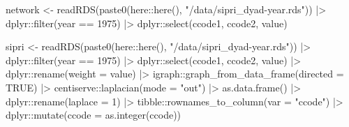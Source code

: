 \documentclass[
  12,
  letterpaper,
  DIV=11,
  numbers=noendperiod]{scrartcl}
\newenvironment{Shaded}{\begin{snugshade}}{\end{snugshade}}
\newcommand{\AttributeTok}[1]{\textcolor[rgb]{0.40,0.45,0.13}{#1}}
\newcommand{\ConstantTok}[1]{\textcolor[rgb]{0.56,0.35,0.01}{#1}}
\newcommand{\DecValTok}[1]{\textcolor[rgb]{0.68,0.00,0.00}{#1}}
\newcommand{\FunctionTok}[1]{\textcolor[rgb]{0.28,0.35,0.67}{#1}}
\newcommand{\NormalTok}[1]{\textcolor[rgb]{0.00,0.23,0.31}{#1}}
\newcommand{\OtherTok}[1]{\textcolor[rgb]{0.00,0.23,0.31}{#1}}
\newcommand{\SpecialCharTok}[1]{\textcolor[rgb]{0.37,0.37,0.37}{#1}}
\newcommand{\StringTok}[1]{\textcolor[rgb]{0.13,0.47,0.30}{#1}}
\begin{document}
\begin{Shaded}
\begin{Highlighting}[numbers=left,,]
\NormalTok{network }\OtherTok{\textless{}{-}} \FunctionTok{readRDS}\NormalTok{(}\FunctionTok{paste0}\NormalTok{(here}\SpecialCharTok{::}\FunctionTok{here}\NormalTok{(), }\StringTok{"/data/sipri\_dyad{-}year.rds"}\NormalTok{)) }\SpecialCharTok{|\textgreater{}}
\NormalTok{  dplyr}\SpecialCharTok{::}\FunctionTok{filter}\NormalTok{(year }\SpecialCharTok{==} \DecValTok{1975}\NormalTok{) }\SpecialCharTok{|\textgreater{}}
\NormalTok{  dplyr}\SpecialCharTok{::}\FunctionTok{select}\NormalTok{(ccode1, ccode2, value)}

\NormalTok{sipri }\OtherTok{\textless{}{-}} \FunctionTok{readRDS}\NormalTok{(}\FunctionTok{paste0}\NormalTok{(here}\SpecialCharTok{::}\FunctionTok{here}\NormalTok{(), }\StringTok{"/data/sipri\_dyad{-}year.rds"}\NormalTok{)) }\SpecialCharTok{|\textgreater{}}
\NormalTok{  dplyr}\SpecialCharTok{::}\FunctionTok{filter}\NormalTok{(year }\SpecialCharTok{==} \DecValTok{1975}\NormalTok{) }\SpecialCharTok{|\textgreater{}}
\NormalTok{  dplyr}\SpecialCharTok{::}\FunctionTok{select}\NormalTok{(ccode1, ccode2, value) }\SpecialCharTok{|\textgreater{}}
\NormalTok{  dplyr}\SpecialCharTok{::}\FunctionTok{rename}\NormalTok{(}\AttributeTok{weight =}\NormalTok{ value) }\SpecialCharTok{|\textgreater{}}
\NormalTok{  igraph}\SpecialCharTok{::}\FunctionTok{graph\_from\_data\_frame}\NormalTok{(}\AttributeTok{directed =} \ConstantTok{TRUE}\NormalTok{) }\SpecialCharTok{|\textgreater{}}
\NormalTok{  centiserve}\SpecialCharTok{::}\FunctionTok{laplacian}\NormalTok{(}\AttributeTok{mode =} \StringTok{"out"}\NormalTok{) }\SpecialCharTok{|\textgreater{}}
  \FunctionTok{as.data.frame}\NormalTok{() }\SpecialCharTok{|\textgreater{}}
\NormalTok{  dplyr}\SpecialCharTok{::}\FunctionTok{rename}\NormalTok{(}\AttributeTok{laplace =} \DecValTok{1}\NormalTok{) }\SpecialCharTok{|\textgreater{}}
\NormalTok{  tibble}\SpecialCharTok{::}\FunctionTok{rownames\_to\_column}\NormalTok{(}\AttributeTok{var =} \StringTok{"ccode"}\NormalTok{) }\SpecialCharTok{|\textgreater{}}
\NormalTok{  dplyr}\SpecialCharTok{::}\FunctionTok{mutate}\NormalTok{(}\AttributeTok{ccode =} \FunctionTok{as.integer}\NormalTok{(ccode))}


\end{Highlighting}
\end{Shaded}
\end{document}
